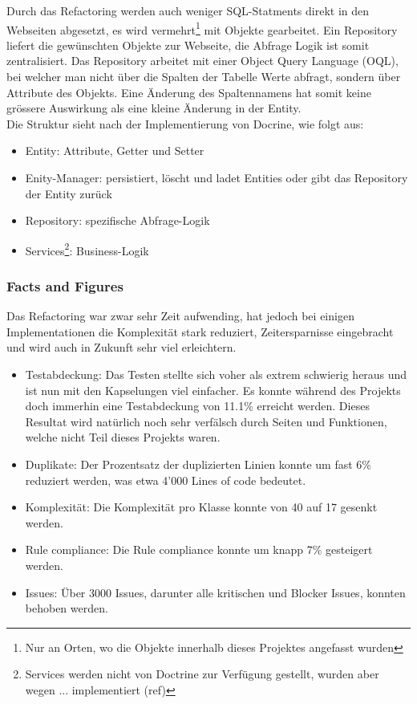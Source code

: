 \FloatBarrier
Durch das Refactoring werden auch weniger SQL-Statments direkt in den Webseiten abgesetzt, es wird vermehrt\footnote{Nur an Orten, wo die Objekte innerhalb dieses Projektes angefasst wurden} mit Objekte gearbeitet. Ein Repository liefert die gewünschten Objekte zur Webseite, die Abfrage Logik ist somit zentralisiert. Das Repository arbeitet mit einer Object Query Language (OQL), bei welcher man nicht über die Spalten der Tabelle Werte abfragt, sondern über Attribute des Objekts. Eine Änderung des Spaltennamens hat somit keine grössere Auswirkung als eine kleine Änderung in der Entity.\\

Die Struktur sieht nach der Implementierung von Docrine, wie folgt aus:
\begin{itemize}
\item Entity: Attribute, Getter und Setter
\item Enity-Manager: persistiert, löscht und ladet Entities oder gibt das Repository der Entity zurück
\item Repository: spezifische Abfrage-Logik
\item Services\footnote{Services werden nicht von Doctrine zur Verfügung gestellt, wurden aber wegen ... implementiert (ref)}: Business-Logik
\end{itemize}

\newpage
\subsubsection{Facts and Figures}
Das Refactoring war zwar sehr Zeit aufwending, hat jedoch bei einigen Implementationen die Komplexität stark reduziert, Zeitersparnisse eingebracht und wird auch in Zukunft sehr viel erleichtern.
\begin{itemize}
\item Testabdeckung: Das Testen stellte sich voher als extrem schwierig heraus und ist nun mit den Kapselungen viel einfacher. Es konnte während des Projekts doch immerhin eine Testabdeckung von 11.1\% erreicht werden. Dieses Resultat wird natürlich noch sehr verfälsch durch Seiten und Funktionen, welche nicht Teil dieses Projekts waren.
\item Duplikate: Der Prozentsatz der duplizierten Linien konnte um fast 6\% reduziert werden, was etwa 4'000 Lines of code bedeutet.
\item Komplexität: Die Komplexität pro Klasse konnte von 40 auf 17 gesenkt werden.
\item Rule compliance: Die Rule compliance konnte um knapp 7\% gesteigert werden.
\item Issues: Über 3000 Issues, darunter alle kritischen und Blocker Issues, konnten behoben werden.
\end{itemize}


